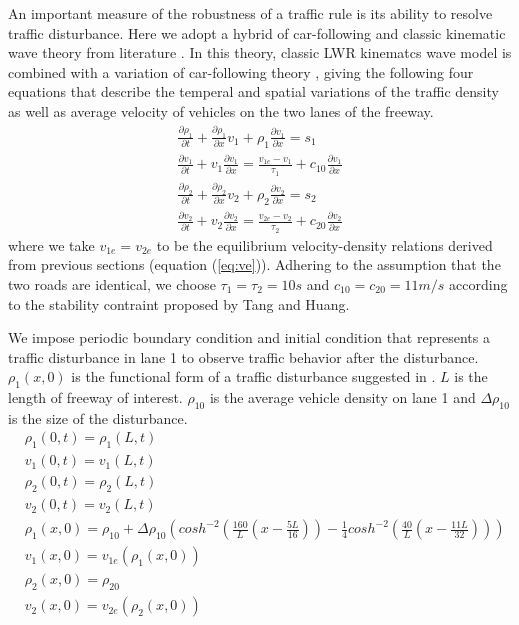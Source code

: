 An important measure of the robustness of a traffic rule is its ability to resolve traffic disturbance. Here we adopt a hybrid of car-following and classic kinematic wave theory from literature \cite{tang_2004}.  In this theory, classic LWR kinematcs wave model \cite{lighthill_1955,richards_1955} is combined with a variation of car-following theory \cite{jiang_2002}, giving the following four equations that describe the temperal and spatial variations of the traffic density as well as average velocity of vehicles on the two lanes of the freeway.
	\begin{align} \label{eq:pde}
	& \frac{\partial \rho_1}{\partial t} + \frac{\partial \rho_1}{\partial x}v_1+\rho_1\frac{\partial v_1}{\partial x}=s_1 & \\
	& \frac{\partial v_1}{\partial t} + v_1\frac{\partial v_1}{\partial x} = \frac{v_{1e}-v_1}{\tau_1}+c_{10}\frac{\partial v_1}{\partial x} & \\
	& \frac{\partial \rho_2}{\partial t} + \frac{\partial \rho_2}{\partial x}v_2+\rho_2\frac{\partial v_2}{\partial x}=s_2 & \\
	& \frac{\partial v_2}{\partial t} + v_2\frac{\partial v_2}{\partial x} = \frac{v_{2e}-v_2}{\tau_2}+c_{20}\frac{\partial v_2}{\partial x} &
	\end{align}
	where we take $v_{1e} = v_{2e}$ to be the equilibrium velocity-density relations derived from previous sections (equation (\ref{eq:ve})). Adhering to the assumption that the two roads are identical, we choose $\tau_1=\tau_2=10s$ and $c_{10}=c_{20}=11m/s$ according to the stability contraint proposed by Tang and Huang\citep{tang_2004}.
	
	We impose periodic boundary condition and initial condition that represents a traffic disturbance in lane 1 to observe traffic behavior after the disturbance. $\rho_1(x,0)$ is the functional form of a traffic disturbance suggested in \citep{tang_2004}. $L$ is the length of freeway of interest. $\rho_{10}$ is the average vehicle density on lane 1 and $\Delta \rho_{10}$ is the size of the disturbance. 
	\begin{align}
	& \rho_1(0,t) = \rho_1(L,t) & \\
	& v_1(0,t) = v_1(L,t) & \\
	& \rho_2(0,t) = \rho_2(L,t) & \\
	& v_2(0,t) = v_2(L,t) & \\
	&\rho_1(x,0)=\rho_{10}+\Delta \rho_{10}\left(  cosh^{-2}(\frac{160}{L}(x-\frac{5L}{16}))-\frac{1}{4}cosh^{-2}(\frac{40}{L}(x-\frac{11L}{32})) \right)& \\
	& v_1(x,0) = v_{1e}(\rho_1(x,0)) & \\
	&\rho_2(x,0)= \rho_{20}& \\ \label{eq:ic}
	& v_2(x,0) = v_{2e}(\rho_2(x,0)) & \\
	\end{align}
	

